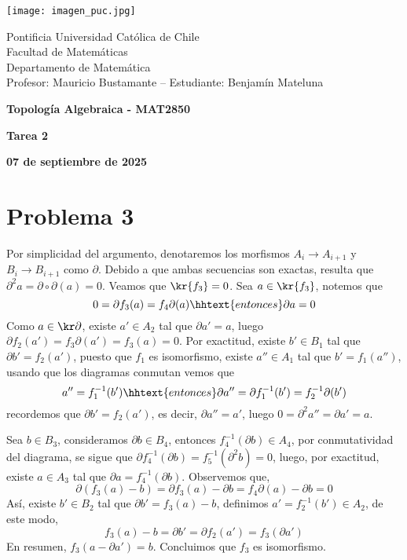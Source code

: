 \documentclass{article}
\begin{document}
\begin{minipage}{2.5cm}
    \texttt{[image: imagen\_puc.jpg]}
\end{minipage}
\begin{minipage}{14cm}
    {\sc Pontificia Universidad Católica de Chile\\
    Facultad de Matemáticas\\
    Departamento de Matemática\\
    Profesor: Mauricio Bustamante -- Estudiante: Benjamín Mateluna}
\end{minipage}
\vspace{1ex}

{\centerline{\bf Topología Algebraica - MAT2850}
\centerline{\bf Tarea 2}}
\centerline{\bf 07 de septiembre de 2025}

\section*{Problema 3}
\noindent Por simplicidad del argumento, denotaremos los morfismos $A_{i}\to A_{i+1}$ y 
$B_{i}\to B_{i+1}$ como $\partial$. Debido a que ambas secuencias son exactas, resulta que 
$\partial^{2}a=\partial\circ\partial (a)=0$. Veamos que $\kr{f_{3}}=0$. Sea $a\in\kr{f_{3}}$,
notemos que
\begin{equation*}
    0=\partial f_{3}(a)=f_{4}\partial(a)\hhtext{entonces}\partial a=0
\end{equation*}
Como $a\in\kr\partial$, existe $a'\in A_{2}$ tal que $\partial a'=a$, luego $\partial f_{2}(a')
=f_{3}\partial(a')=f_{3}(a)=0$. Por exactitud, existe $b'\in B_{1}$ tal que $\partial b'
=f_{2}(a')$, puesto que $f_{1}$ es isomorfismo, existe $a''\in A_{1}$ tal que $b'=f_{1}(a'')$, 
usando que los diagramas conmutan vemos que
\begin{equation*}
    a''=f^{-1}_{1}(b')\hhtext{entonces}\partial a''=\partial f^{-1}_{1}(b')=f^{-1}_{2}\partial(b')
\end{equation*}
recordemos que $\partial b'=f_{2}(a')$, es decir, $\partial a''=a'$, luego 
$0=\partial^{2}a''=\partial a'=a$.

\vspace{2mm}
\noindent Sea $b\in B_{3}$, consideramos $\partial b\in B_{4}$, entonces 
$f^{-1}_{4}(\partial b)\in A_{4}$, por conmutatividad del diagrama, se sigue que
$\partial f_{4}^{-1}(\partial b)=f_{5}^{-1}(\partial^{2}b)=0$, luego, por exactitud, existe
$a\in A_{3}$ tal que $\partial a=f_{4}^{-1}(\partial b)$. Observemos que,
\begin{equation*}
    \partial(f_{3}(a)-b)=\partial f_{3}(a)-\partial b=f_{4}\partial(a)-\partial b=0
\end{equation*}
Así, existe $b'\in B_{2}$ tal que $\partial b'=f_{3}(a)-b$, definimos 
$a'=f_{2}^{-1}(b')\in A_{2}$, de este modo,
\begin{equation*}
    f_{3}(a)-b=\partial b'=\partial f_{2}(a')=f_{3}(\partial a')
\end{equation*}
En resumen, $f_{3}(a-\partial a')=b$. Concluimos que $f_{3}$ es isomorfismo.
\end{document}
